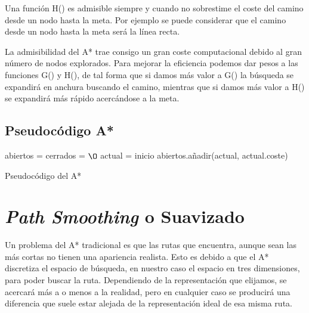 Una función H() es admisible siempre y cuando no sobrestime el coste del camino desde un nodo hasta la meta. Por ejemplo se puede considerar que el camino desde un nodo hasta la meta será la línea recta.

La admisibilidad del A* trae consigo un gran coste computacional debido al gran número de nodos explorados. Para mejorar la eficiencia podemos dar pesos a las funciones G() y H(), de tal forma que si damos más valor a G() la búsqueda se expandirá en anchura buscando el camino, mientras que si damos más valor a H() se expandirá más rápido acercándose a la meta.

\subsection{Pseudocódigo A*}

\begin{algorithm}[H]
 abiertos = cerrados = $\O$\;
 actual = inicio\;
 abiertos.añadir(actual, actual.coste)\;

 \nl{}
 \caption{Pseudocódigo del A*}
\end{algorithm}

\section{\textit{Path Smoothing} o Suavizado}

Un problema del A* tradicional es que las rutas que encuentra, aunque sean las más cortas no tienen una apariencia realista. Esto es debido a que el A* discretiza el espacio de búsqueda, en nuestro caso el espacio en tres dimensiones, para poder buscar la ruta. Dependiendo de la representación que elijamos, se acercará más a o menos a la realidad, pero en cualquier caso se producirá una diferencia que suele estar alejada de la representación ideal de esa misma ruta.

